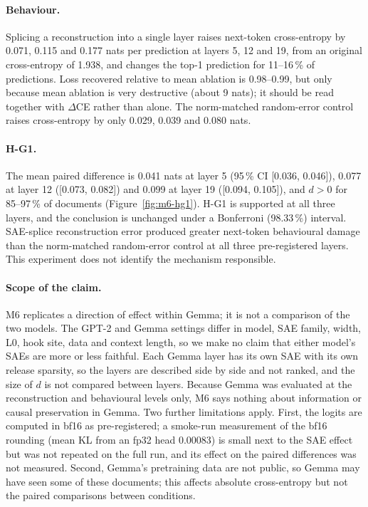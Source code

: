 \paragraph{Behaviour.} Splicing a reconstruction into a single layer raises next-token cross-entropy by 0.071, 0.115 and
0.177 nats per prediction at layers 5, 12 and 19, from an original cross-entropy of 1.938, and changes the top-1
prediction for 11--16\,\% of predictions. Loss recovered relative to mean ablation is 0.98--0.99, but only because mean
ablation is very destructive (about 9 nats); it should be read together with $\Delta$CE rather than alone. The
norm-matched random-error control raises cross-entropy by only 0.029, 0.039 and 0.080 nats.

\paragraph{H-G1.} The mean paired difference is 0.041 nats at layer 5 (95\,\% CI [0.036, 0.046]), 0.077 at layer 12
([0.073, 0.082]) and 0.099 at layer 19 ([0.094, 0.105]), and $d>0$ for 85--97\,\% of documents
(Figure~\ref{fig:m6-hg1}). H-G1 is supported at all three layers, and the conclusion is unchanged under a Bonferroni
(98.33\,\%) interval. SAE-splice reconstruction error produced greater next-token behavioural damage than the
norm-matched random-error control at all three pre-registered layers. This experiment does not identify the mechanism
responsible.

\paragraph{Scope of the claim.} M6 replicates a direction of effect within Gemma; it is not a comparison of the two
models. The GPT-2 and Gemma settings differ in model, SAE family, width, L0, hook site, data and context length, so we
make no claim that either model's SAEs are more or less faithful. Each Gemma layer has its own SAE with its own release
sparsity, so the layers are described side by side and not ranked, and the size of $d$ is not compared between layers.
Because Gemma was evaluated at the reconstruction and behavioural levels only, M6 says nothing about information or
causal preservation in Gemma. Two further limitations apply. First, the logits are computed in bf16 as pre-registered;
a smoke-run measurement of the bf16 rounding (mean KL from an fp32 head 0.00083) is small next to the SAE effect but was
not repeated on the full run, and its effect on the paired differences was not measured. Second, Gemma's pretraining
data are not public, so Gemma may have seen some of these documents; this affects absolute cross-entropy but not the
paired comparisons between conditions.


